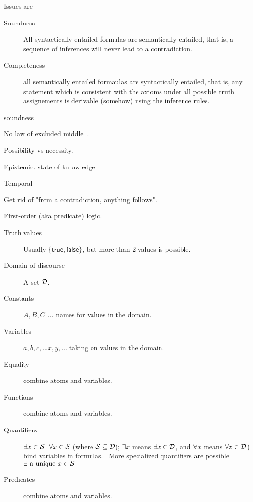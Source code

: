 Issues are 
\begin{description}
\item[Soundness]
All syntactically entailed formulas
are semantically entailed, that is,
a sequence of inferences will never lead to a contradiction.

\item[Completeness] 
all semantically entailed formaulas 
are syntactically entailed, that is,
any statement which is consistent with the axioms under all 
possible truth assignements is derivable (somehow) using the 
inference rules.
\end{description}soundness 

\label{sec:Intuitionist_zeroth_order_logic}

\cite{wiki:Intuitionistic_logic}

No law of excluded middle~\cite{wiki:Law_of_excluded_middle}.

\label{sec:Modal_logic}

\cite{wiki:Modal_logic}

Possibility vs necessity.

Epistemic: state of kn owledge

Temporal 

\label{sec:Paraconsistent_logic}

\cite{wiki:Paraconsistent_logic}

Get rid of "from a contradiction, anything follows".
\label{sec:First_order_logic}

First-order (aka predicate) logic.~\cite{wiki:First_order_logic,
sep:logic_firstorder_emergence}

\begin{description}
\item[Truth values] Usually $\{\mathsf{true},\mathsf{false}\}$,
but more than $2$ values is possible.
\item[Domain of discourse] A set $\mathcal{D}$.
\item[Constants] $A,B,C, \ldots$ names for values in the
domain.
\item[Variables] $a,b,c, \ldots x,y,\dots$ taking on values in the
domain.~\cite{wiki:Free_variables_and_bound_variables}
\item[Equality] combine atoms and variables.
\item[Functions] combine atoms and variables.
\item[Quantifiers]   
$\exists x \in \mathcal{S}$, $\forall x \in \mathcal{S}$ 
(where $\mathcal{S} \subseteq \mathcal{D}$);
$\exists x$ means $\exists x \in \mathcal{D}$, 
and
$\forall x$ means $\forall x \in \mathcal{D}$) 
bind variables in
formulas.~\cite{wiki:Quantifier_logic}
More specialized quantifiers are possible:
$\exists \textrm{ a unique } x \in \mathcal{S}$
\item[Predicates] combine atoms and variables.
\end{description} 

